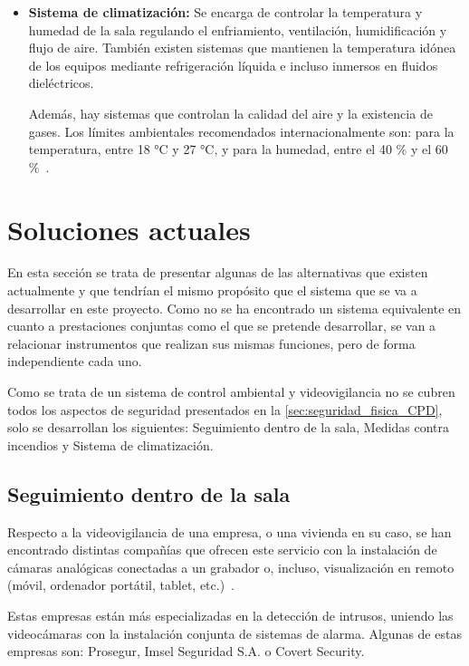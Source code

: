 \begin{itemize}
	\item \textbf{Sistema de climatización:} Se encarga de controlar la temperatura y humedad de la sala regulando el enfriamiento, ventilación, humidificación y flujo de aire. También existen sistemas que mantienen la temperatura idónea de los equipos mediante refrigeración líquida e incluso inmersos en fluidos dieléctricos.

	Además, hay sistemas que controlan la calidad del aire y la existencia de gases. Los límites ambientales recomendados internacionalmente son: para la temperatura, entre 18 °C y 27 °C, y para la humedad, entre el 40 \% y el 60 \%~\cite{serverscheck_recommended_nodate}.
\end{itemize}

\section{Soluciones actuales}\label{sec:soluciones-actuales}
En esta sección se trata de presentar algunas de las alternativas que existen actualmente y que tendrían el mismo propósito que el sistema que se va a desarrollar en este proyecto. Como no se ha encontrado un sistema equivalente en cuanto a prestaciones conjuntas como el que se pretende desarrollar, se van a relacionar instrumentos que realizan sus mismas funciones, pero de forma independiente cada uno.

Como se trata de un sistema de control ambiental y videovigilancia no se cubren todos los aspectos de seguridad presentados en la \autoref{sec:seguridad_fisica_CPD}, solo se desarrollan los siguientes: Seguimiento dentro de la sala, Medidas contra incendios y Sistema de climatización.

\subsection{Seguimiento dentro de la sala}\label{subsec:seguimiento-dentro-de-la-sala}
Respecto a la videovigilancia de una empresa, o una vivienda en su caso, se han encontrado distintas compañías que ofrecen este servicio con la instalación de cámaras analógicas conectadas a un grabador o, incluso, visualización en remoto (móvil, ordenador portátil, tablet, etc.)~\cite{alarmadoo_videovigilancia_nodate}.

Estas empresas están más especializadas en la detección de intrusos, uniendo las videocámaras con la instalación conjunta de sistemas de alarma. Algunas de estas empresas son: Prosegur, Imsel Seguridad S.A. o Covert Security.

